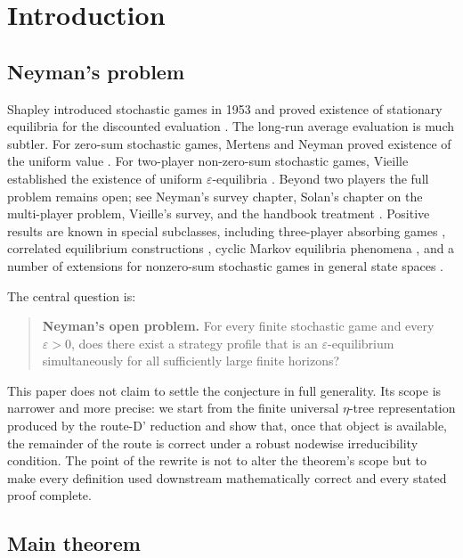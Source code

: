 \documentclass[12pt]{article}
\theoremstyle{definition}
\newcommand{\eps}{\varepsilon}
\newcommand{\1}{\mathbf{1}}
\begin{document}
\tableofcontents

\section{Introduction}

\subsection{Neyman's problem}

Shapley introduced stochastic games in 1953 and proved existence of stationary
equilibria for the discounted evaluation \cite{Shapley1953}.  The long-run average
evaluation is much subtler.  For zero-sum stochastic games, Mertens and Neyman
proved existence of the uniform value \cite{MertensNeyman1981}.  For two-player
non-zero-sum stochastic games, Vieille established the existence of uniform
$\eps$-equilibria \cite{Vieille2000I,Vieille2000II}.  Beyond two players the full
problem remains open; see Neyman's survey chapter, Solan's chapter on the
multi-player problem, Vieille's survey, and the handbook treatment
\cite{Neyman2003,Solan2003,Vieille2002,MertensSorinZamir2003}.  Positive results
are known in special subclasses, including three-player absorbing games
\cite{Solan1999}, correlated equilibrium constructions \cite{SolanVieille2002},
cyclic Markov equilibria phenomena \cite{FleschThuijsmanVrieze1997}, and a number
of extensions for nonzero-sum stochastic games in general state spaces
\cite{Nowak2003}.

The central question is:
\begin{quote}
\textbf{Neyman's open problem.}
For every finite stochastic game and every $\eps>0$, does there exist a strategy
profile that is an $\eps$-equilibrium simultaneously for all sufficiently large
finite horizons?
\end{quote}

This paper does not claim to settle the conjecture in full generality.  Its scope
is narrower and more precise: we start from the finite universal $\eta$-tree
representation produced by the route-D' reduction and show that, once that object
is available, the remainder of the route is correct under a robust nodewise
irreducibility condition.  The point of the rewrite is not to alter the theorem's
scope but to make every definition used downstream mathematically correct and every
stated proof complete.

\subsection{Main theorem}
\end{document}
